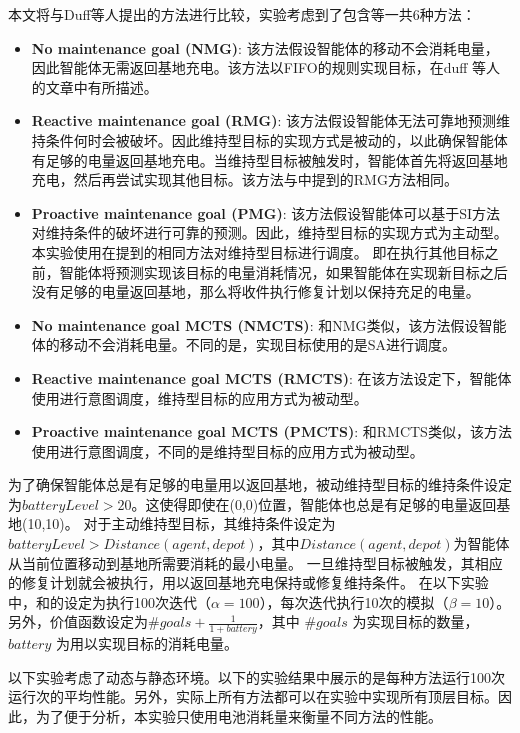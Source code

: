 本文将\SAM 与Duff等人提出的方法\cite{DBLP:conf/atal/DuffHT06}进行比较，实验考虑到了包含\SAM 等一共6种方法：

\begin{itemize}
\item \textbf{No maintenance goal (NMG)}: 该方法假设智能体的移动不会消耗电量，因此智能体无需返回基地充电。该方法以FIFO的规则实现目标，在duff 等人的文章\cite{DBLP:conf/atal/DuffHT06}中有所描述。
\item \textbf{Reactive maintenance goal (RMG)}: 该方法假设智能体无法可靠地预测维持条件何时会被破坏。因此维持型目标的实现方式是被动的，以此确保智能体有足够的电量返回基地充电。当维持型目标被触发时，智能体首先将返回基地充电，然后再尝试实现其他目标。该方法与\cite{DBLP:conf/atal/DuffHT06}中提到的RMG方法相同。
\item \textbf{Proactive maintenance goal (PMG)}: 该方法假设智能体可以基于SI方法对维持条件的破坏进行可靠的预测。因此，维持型目标的实现方式为主动型。本实验使用在\cite{DBLP:conf/atal/DuffHT06}提到的相同方法对维持型目标进行调度。
即在执行其他目标之前，智能体将预测实现该目标的电量消耗情况，如果智能体在实现新目标之后没有足够的电量返回基地，那么将收件执行修复计划以保持充足的电量。

\item \textbf{No maintenance goal MCTS (NMCTS)}: 和NMG类似，该方法假设智能体的移动不会消耗电量。不同的是，实现目标使用的是SA进行调度。
\item \textbf{Reactive maintenance goal MCTS (RMCTS)}: 在该方法设定下，智能体使用\SAM 进行意图调度，维持型目标的应用方式为被动型。
\item \textbf{Proactive maintenance goal MCTS (PMCTS)}: 和RMCTS类似，该方法使用\SAM 进行意图调度，不同的是维持型目标的应用方式为被动型。
\end{itemize}

%
为了确保智能体总是有足够的电量用以返回基地，被动维持型目标的维持条件设定为$batteryLevel > 20$。这使得即使在(0,0)位置，智能体也总是有足够的电量返回基地(10,10)。
%
对于主动维持型目标，其维持条件设定为$batteryLevel > Distance(agent, depot)$，其中$Distance(agent, depot)$为智能体从当前位置移动到基地所需要消耗的最小电量。
%
一旦维持型目标被触发，其相应的修复计划就会被执行，用以返回基地充电保持或修复维持条件。
%
在以下实验中，\SAM 和\SA 的设定为执行100次迭代（$\alpha = 100$），每次迭代执行10次的模拟（$\beta = 10$）。另外，价值函数设定为$\#goals + \frac{1}{1 + {battery}}$，其中 $\#goals$ 为实现目标的数量， $battery$ 为用以实现目标的消耗电量。

以下实验考虑了动态与静态环境。以下的实验结果中展示的是每种方法运行100次运行次的平均性能。另外，实际上所有方法都可以在实验中实现所有顶层目标。因此，为了便于分析，本实验只使用电池消耗量来衡量不同方法的性能。
